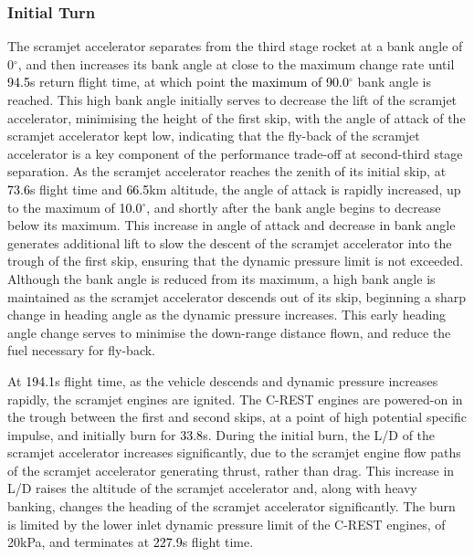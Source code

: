 \subsubsection{ Initial Turn}
The scramjet accelerator separates from the third stage rocket at a bank angle of 0$^\circ$, and then increases its bank angle at close to the maximum change rate until \textcolor{black}{94.5}s return flight time, at which point \textcolor{black}{ the maximum of 90.0}$^\circ$ bank angle is reached. This high bank angle initially serves to decrease the lift of the scramjet accelerator, minimising the height of the first skip, with the angle of attack of the scramjet accelerator kept low, indicating that the fly-back of the scramjet accelerator is a key component of the performance trade-off at second-third stage separation. As the scramjet accelerator reaches the zenith of its initial skip, at \textcolor{black}{73.6}s flight time and \textcolor{black}{66.5}km altitude, the angle of attack is rapidly increased, up to the maximum of \textcolor{black}{10.0}$^\circ$, and shortly after the bank angle begins to decrease below its maximum. This increase in angle of attack and decrease in bank angle generates additional lift to slow the descent of the scramjet accelerator into the trough of the first skip, ensuring that the dynamic pressure limit is not exceeded. 
Although the bank angle is reduced from its maximum, a high bank angle is maintained as the scramjet accelerator descends out of its skip, beginning a sharp change in heading angle as the dynamic pressure increases. 
This early heading angle change serves to minimise the down-range distance flown, and reduce the fuel necessary for fly-back. 


At \textcolor{black}{194.1}s flight time, as the vehicle descends and dynamic pressure increases rapidly, the scramjet engines are ignited. The C-REST engines are powered-on in the trough between the first and second skips, at a point of high potential specific impulse, and initially burn for \textcolor{black}{33.8}s. During the initial burn, the L/D of the scramjet accelerator increases significantly, due to the scramjet engine flow paths of the scramjet accelerator generating thrust, rather than drag. 
This increase in L/D raises the altitude of the scramjet accelerator and, along with heavy banking, changes the heading of the scramjet accelerator significantly. 
The burn is limited by the lower inlet dynamic pressure limit of the C-REST engines, of 20kPa, and terminates at \textcolor{black}{227.9}s flight time. 

